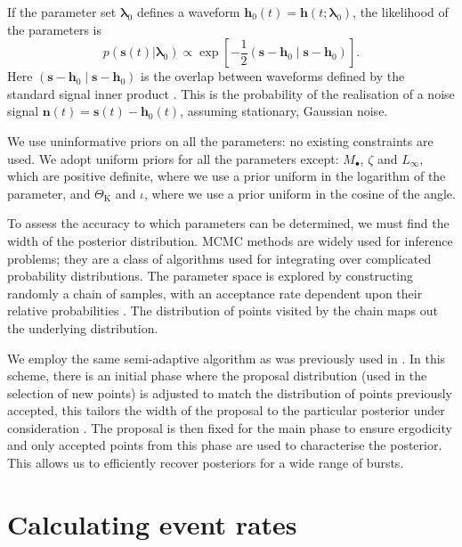 \documentclass[useAMS,usedcolumn,usegraphicx,usenatbib]{mn2e}
\newcommand{\sub}[1]{\ensuremath{_\mathrm{#1}}}
\newcommand{\recip}[1]{\ensuremath{\dfrac{1}{#1}}}
\newcommand{\innerprod}[2]{\ensuremath{\left({#1}\middle|{#2}\right)}}
\begin{document}
If the parameter set $\boldsymbol{\lambda}_0$ defines a waveform $\boldsymbol{h}_0(t) = \boldsymbol{h}(t; \boldsymbol{\lambda}_0)$, the likelihood of the parameters is
\begin{equation}
p(\boldsymbol{s}(t)|\boldsymbol{\lambda}_0) \propto \exp\left[-\recip{2}\innerprod{\boldsymbol{s}-\boldsymbol{h}_0}{\boldsymbol{s}-\boldsymbol{h}_0}\right].
\label{eq:likelihood}
\end{equation}
Here $\innerprod{\boldsymbol{s}-\boldsymbol{h}_0}{\boldsymbol{s}-\boldsymbol{h}_0}$ is the overlap between waveforms defined by the standard signal inner product \citep{Cutler1994}. This is the probability of the realisation of a noise signal $\boldsymbol{n}(t) = \boldsymbol{s}(t) - \boldsymbol{h}_0(t)$, assuming stationary, Gaussian noise.

We use uninformative priors on all the parameters: no existing constraints are used. We adopt uniform priors for all the parameters except: $M_\bullet$, $\zeta$ and $L_\infty$, which are positive definite, where we use a prior uniform in the logarithm of the parameter, and $\Theta\sub{K}$ and $\iota$, where we use a prior uniform in the cosine of the angle.

To assess the accuracy to which parameters can be determined, we must find the width of the posterior distribution. MCMC methods are widely used for inference problems; they are a class of algorithms used for integrating over complicated probability distributions. The parameter space is explored by constructing randomly a chain of samples, with an acceptance rate dependent upon their relative probabilities \citep{Metropolis1953,Hastings1970}. The distribution of points visited by the chain maps out the underlying distribution.

We employ the same semi-adaptive algorithm as was previously used in \citet{Berry2013}. In this scheme, there is an initial phase where the proposal distribution (used in the selection of new points) is adjusted to match the distribution of points previously accepted, this tailors the width of the proposal to the particular posterior under consideration \citep*{Haario1999}. The proposal is then fixed for the main phase to ensure ergodicity \citep{Roberts2007,Andrieu2008} and only accepted points from this phase are used to characterise the posterior. This allows us to efficiently recover posteriors for a wide range of bursts.

\section{Calculating event rates}\label{sec:Rates}
\end{document}
